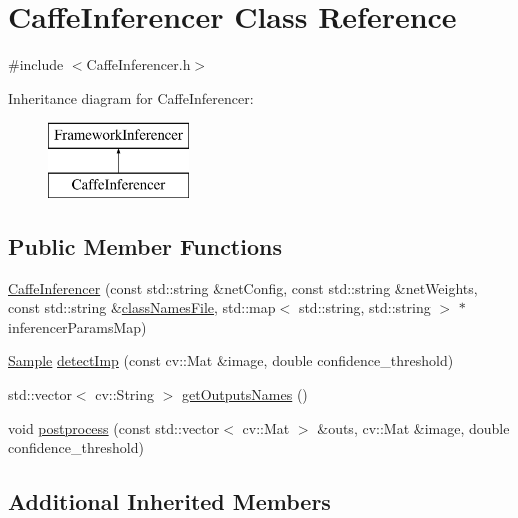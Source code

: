 \hypertarget{class_caffe_inferencer}{}\section{Caffe\+Inferencer Class Reference}
\label{class_caffe_inferencer}


{\ttfamily \#include $<$Caffe\+Inferencer.\+h$>$}

Inheritance diagram for Caffe\+Inferencer\+:\begin{figure}[H]
\begin{center}
\leavevmode
\includegraphics[height=2.000000cm]{class_caffe_inferencer}
\end{center}
\end{figure}
\subsection*{Public Member Functions}
\begin{DoxyCompactItemize}
\item 
\hyperlink{class_caffe_inferencer_a061bf73e8736135e292154d9fa50d13d}{Caffe\+Inferencer} (const std\+::string \&net\+Config, const std\+::string \&net\+Weights, const std\+::string \&\hyperlink{class_framework_inferencer_abdb304d43262f48e0438a55778c7540f}{class\+Names\+File}, std\+::map$<$ std\+::string, std\+::string $>$ $\ast$inferencer\+Params\+Map)
\item 
\hyperlink{struct_sample}{Sample} \hyperlink{class_caffe_inferencer_a898f6d0e7106ac663a6c26ecdf799502}{detect\+Imp} (const cv\+::\+Mat \&image, double confidence\+\_\+threshold)
\item 
std\+::vector$<$ cv\+::\+String $>$ \hyperlink{class_caffe_inferencer_a92db0b7b61f5f7bbfcee3c1905022082}{get\+Outputs\+Names} ()
\item 
void \hyperlink{class_caffe_inferencer_a3eb860abbe252b50d6f17104bf751b62}{postprocess} (const std\+::vector$<$ cv\+::\+Mat $>$ \&outs, cv\+::\+Mat \&image, double confidence\+\_\+threshold)
\end{DoxyCompactItemize}
\subsection*{Additional Inherited Members}


